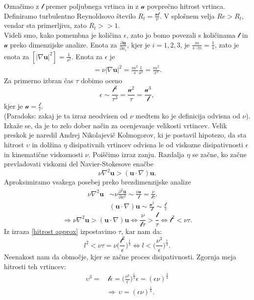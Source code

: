 \documentclass[mat2, tisk]{fmfdelo}
\newcommand{\bd}{\textbf}
\begin{document}
Označimo z $\mathscr{l}$ premer poljubnega vrtinca in z $\mathscr{u}$ povprečno hitrost vrtinca.
Definiramo turbulentno Reynoldsovo število $R_t = \frac{\mathscr{u}\mathscr{l}}{\nu}$. 
V splošnem velja $Re > R_t$, vendar sta primerljiva, zato $R_t >> 1$. \\
Videli smo, kako pomembna je količina $\epsilon$, zato jo bomo povezali s količinama 
$\mathscr{l}$ in $\mathscr{u}$ preko dimenzijske analize. Enota za $\frac{\partial \bd{u}}{\partial x_i}$,
kjer je $i=1,2,3$, je $\frac{m}{s\cdot m} = \frac{1}{s}$, zato je enota za $[|\nabla \bd{u}|^2] = \frac{1}{s^2}$.
Enota za $\epsilon$ je 
\begin{align*}
[\epsilon] = \nu |\nabla \bd{u}|^2 = \frac{m^2}{s} \frac{1}{s^2} = \frac{m^2}{s^3}.
\end{align*}
Za primerno izbran čas $\tau$ dobimo oceno
\begin{equation}
\label{hitrost approx}
\epsilon \sim \frac{\mathscr{l}^2}{\tau^3} = \frac{\mathscr{u}^2}{\tau} = \frac{\mathscr{u^3}}{\mathscr{l}},
\end{equation}
kjer je $\mathscr{u} = \frac{\mathscr{l}}{\tau}$.\\
(Paradoks: zakaj je ta izraz neodvisen od $\nu$ medtem ko je definicija odvisna od $\nu$).\\
Izkaže se, da je to zelo dober način za ocenjevanje velikosti vrtincev. Velik preskok je 
naredil Andrej Nikolajevič Kolmogorov, ki je postavil hipotezo, da sta hitrost $\upsilon$ 
in dolžina $\eta$ disipativnih vrtincev odvisna le od viskozne disipativnosti $\epsilon$ 
in kinematične viskoznosti $\nu$. Poiščimo izraz zanju.
Razdalja $\eta$  se začne, ko začne prevladovati viskozni del Navier-Stokesove enačbe 
$$
\nu \nabla^2 \bd{u} > (\bd{u}\cdot \nabla)\bd{u}.
$$
Aproksimiramo vsakega posebej preko brezdimenzijske analize 
\begin{align*}
\nu \nabla^2 \bd{u} &\sim \nu \frac{\partial^2 \bd{u}}{\partial x^2} \sim \frac{\nu \mathscr{u}}{\mathscr{l}} = \frac{\nu}{\mathscr{l}\tau}. \\[2mm]
&(\bd{u}\cdot \nabla)\bd{u} \sim \frac{\mathscr{u}^2}{\mathscr{l}} \sim \frac{\mathscr{l}}{\tau}
\end{align*}
$$                                                                                                      \Longrightarrow \nu \nabla^2 \bd{u} > (\bd{u}\cdot \nabla)\bd{u} \iff \frac{\nu}{\mathscr{l}\tau} > \frac{\mathscr{l}}{\tau} \iff \mathscr{l}^2 < \nu \tau.
$$
Iz izraza \ref{hitrost approx} izpostavimo $\tau$, kar nam da:
$$
l^2 < \nu \tau = \nu \Big(\frac{\mathscr{l}^2}{\epsilon} \Big)^\frac{1}{3} \iff l < \Big(\frac{\nu^3}{\epsilon} \Big)^\frac{1}{4}.
$$
Neenakost nam da območje, kjer se začne proces disipativnosti. 
Zgornja meja hitrosti teh vrtincev:
\begin{align*}
\upsilon^3 =& \,\mathscr{l}\epsilon = \Big(\frac{\nu^3}{\epsilon}\Big)^\frac{1}{4} \epsilon = (\epsilon \nu)^\frac{3}{4} \\
&\Longrightarrow\, \upsilon = (\epsilon \nu)^\frac{1}{4}.
\end{align*}
\end{document}
